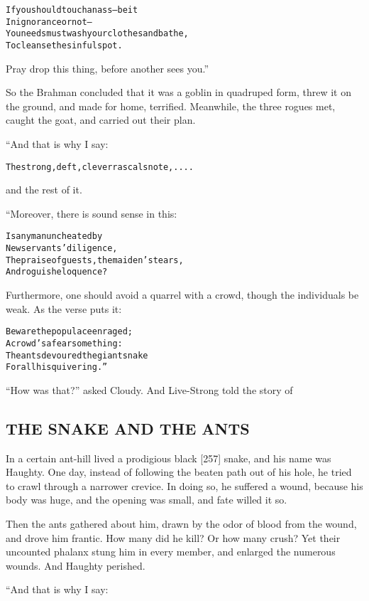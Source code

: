 \documentclass{article}
\renewenvironment{verbatim}{\begin{alltt}\normalfont\begin{centering}}{\end{centering}\end{alltt}}
\begin{document}
\begin{verbatim}
If you should touch an ass--be it
    In ignorance or not--
You needs must wash your clothes and bathe,
    To cleanse the sinful spot.
\end{verbatim}
Pray drop this thing, before another sees you.”

So the Brahman concluded that it was a goblin in quadruped form,
threw it on the ground, and made for home, terrified. Meanwhile,
the three rogues met, caught the goat, and carried out their plan.

“And that is why I say:

\begin{verbatim}
The strong, deft, clever rascals note, ....
\end{verbatim}
and the rest of it.

“Moreover, there is sound sense in this:

\begin{verbatim}
Is any man uncheated by
    New servants’ diligence,
The praise of guests, the maiden’s tears,
    And roguish eloquence?
\end{verbatim}
Furthermore, one should avoid a quarrel with a crowd, though the
individuals be weak. As the verse puts it:

\begin{verbatim}
Beware the populace enraged;
    A crowd's a fearsome thing:
The ants devoured the giant snake
    For all his quivering.”
\end{verbatim}
``How was that?'' asked Cloudy. And Live-Strong told the story of

\subsection{THE SNAKE AND THE ANTS}

In a certain ant-hill lived a prodigious black [257] snake, and his
name was Haughty. One day, instead of following the beaten path out
of his hole, he tried to crawl through a narrower crevice. In doing
so, he suffered a wound, because his body was huge, and the opening
was small, and fate willed it so.

Then the ants gathered about him, drawn by the odor of blood from
the wound, and drove him frantic. How many did he kill? Or how many
crush? Yet their uncounted phalanx stung him in every member, and
enlarged the numerous wounds. And Haughty perished.

“And that is why I say:
\end{document}
